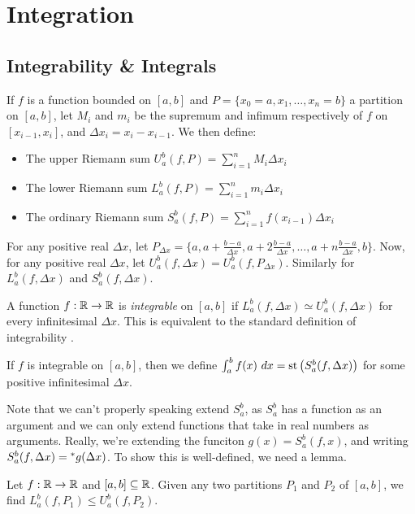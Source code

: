 \section{Integration}


\subsection{Integrability \& Integrals}
If $f$ is a function bounded on $[a, b]$ and $P = \{x_0 = a, x_1, \ldots, x_n = b\}$ a partition on $[a, b]$, let $M_i$ and $m_i$ be the supremum and infimum respectively of $f$ on $[x_{i-1}, x_i]$, and $\Delta x_i = x_i - x_{i-1}$. We then define:
\begin{itemize}
    \item The upper Riemann sum $U_a^b(f, P) = \sum_{i=1}^n M_i\Delta x_i$
    \item The lower Riemann sum $L_a^b(f, P) =\sum_{i=1}^n m_i\Delta x_i$
    \item The ordinary Riemann sum $S_a^b(f, P) = \sum_{i=1}^n f(x_{i-1})\Delta x_i$
\end{itemize}
For any positive real $\Delta x$, let $P_{\Delta x} = \{a, a+\frac{b-a}{\Delta x}, a + 2\frac{b-a}{\Delta x}, \ldots, a + n\frac{b-a}{\Delta x}, b\}$. Now, for any positive real $\Delta x$, let $U_a^b(f, \Delta x) = U_a^b(f, P_{\Delta x})$. Similarly for $L_a^b(f, \Delta x)$ and $S_a^b(f, \Delta x)$.

A function $f: \mathbb{R} \to \mathbb{R}$ is \textit{integrable} on $[a, b]$ if $L_a^b(f, \Delta x) \simeq U_a^b(f, \Delta x)$ for every infinitesimal $\Delta x$. This is equivalent to the standard definition of integrability \cite[110]{goldblatt1998}.

\begin{defn}
If $f$ is integrable on $[a, b]$, then we define $\int_a^b f(x)\ dx = \operatorname{st}\left(S_a^b(f, \Delta x)\right)$ for some positive infinitesimal $\Delta x$. 
\end{defn}
Note that we can't properly speaking extend $S_a^b$, as $S_a^b$ has a function as an argument and we can only extend functions that take in real numbers as arguments. Really, we're extending the funciton $g(x) = S_a^b (f, x)$, and writing $S_a^b (f, \Delta x) = \prescript{*}{}{g}(\Delta x)$. To show this is well-defined, we need a lemma.

\begin{lemma}
    Let $f: \mathbb{R} \to \mathbb{R}$ and $[a, b] \subseteq \mathbb{R}$. Given any two partitions $P_1$ and $P_2$ of $[a, b]$, we find $L_a^b(f, P_1) \leq U_a^b(f, P_2)$.
\end{lemma}

